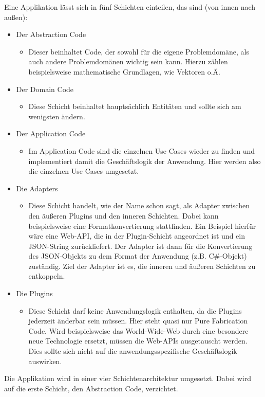 Eine Applikation lässt sich in fünf Schichten einteilen, das sind (von innen nach außen):
\begin{itemize}
\item Der Abstraction Code
\begin{itemize}
\item Dieser beinhaltet Code, der sowohl für die eigene Problemdomäne, als auch andere Problemdomänen wichtig sein kann. Hierzu zählen beispielsweise mathematische Grundlagen, wie Vektoren o.Ä.
\end{itemize}
\item Der Domain Code
\begin{itemize}
\item Diese Schicht beinhaltet hauptsächlich Entitäten und sollte sich am wenigsten ändern.
\end{itemize}
\item Der Application Code
\begin{itemize}
\item Im Application Code sind die einzelnen Use Cases wieder zu finden und implementiert damit die Geschäftslogik der Anwendung. Hier werden also die einzelnen Use Cases umgesetzt.
\end{itemize}
\item Die Adapters
\begin{itemize}
\item Diese Schicht handelt, wie der Name schon sagt, als Adapter zwischen den äußeren Plugins und den inneren Schichten. Dabei kann beispielsweise eine Formatkonvertierung stattfinden. Ein Beispiel hierfür wäre eine Web-API, die in der Plugin-Schicht angeordnet ist und ein JSON-String zurückliefert. Der Adapter ist dann für die Konvertierung des JSON-Objekts zu dem Format der Anwendung (z.B. C\#-Objekt) zuständig. Ziel der Adapter ist es, die inneren und äußeren Schichten zu entkoppeln.
\end{itemize}
\item Die Plugins
\begin{itemize}
\item Diese Schicht darf keine Anwendungslogik enthalten, da die Plugins jederzeit änderbar sein müssen. Hier steht quasi nur Pure Fabrication Code. Wird beispielsweise das World-Wide-Web durch eine besondere neue Technologie ersetzt, müssen die Web-APIs ausgetauscht werden. Dies sollte sich nicht auf die anwendungsspezifische Geschäftslogik auswirken.
\end{itemize}
\end{itemize}
Die Applikation wird in einer vier Schichtenarchitektur umgesetzt. Dabei wird auf die erste Schicht, den Abstraction Code, verzichtet.
